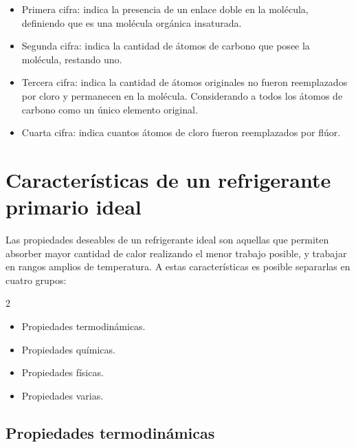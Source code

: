 	\begin{itemize}
		\item Primera cifra: indica la presencia de un enlace doble en la molécula, definiendo que es una molécula orgánica insaturada.
		\item Segunda cifra: indica la cantidad de átomos de carbono que posee la molécula, restando uno. 
		\item Tercera cifra: indica la cantidad de átomos originales no fueron reemplazados por cloro y permanecen en la molécula. Considerando a todos los átomos de carbono como un único elemento original. 
		\item Cuarta cifra: indica cuantos átomos de cloro fueron reemplazados por flúor.
	\end{itemize}

	\section{Características de un refrigerante primario ideal}\label{S1-Características de un refrigerante ideal}

	Las propiedades deseables de un refrigerante ideal son aquellas que permiten absorber mayor cantidad de calor realizando el menor trabajo posible, y trabajar en rangos amplios de temperatura. A estas características es posible separarlas en cuatro grupos: 

	\begin{multicols}{2}
	\begin{itemize}
		\item Propiedades termodinámicas.
		\item Propiedades químicas.
		\item Propiedades físicas.
		\item Propiedades varias.
	\end{itemize}

	\end{multicols}

	\subsection{Propiedades termodinámicas}
	

